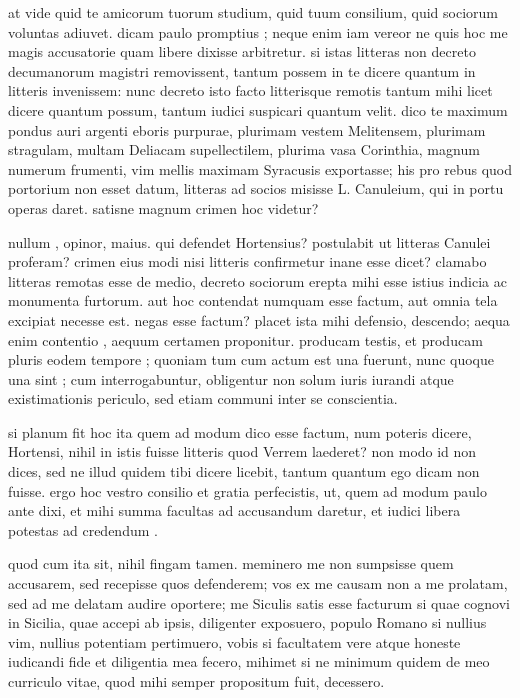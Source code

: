  at vide quid te amicorum tuorum studium, quid tuum consilium, quid sociorum voluntas adiuvet. dicam paulo promptius ; neque enim iam vereor ne quis hoc me magis accusatorie quam libere dixisse arbitretur. si istas litteras non decreto decumanorum magistri removissent, tantum possem in te dicere quantum in litteris invenissem: nunc decreto isto facto litterisque remotis tantum mihi licet dicere quantum possum, tantum iudici suspicari quantum velit. dico te maximum pondus auri argenti eboris purpurae, plurimam vestem Melitensem, plurimam stragulam, multam Deliacam supellectilem, plurima vasa Corinthia, magnum numerum frumenti, vim mellis maximam Syracusis exportasse; his pro rebus quod portorium non esset datum, litteras ad socios misisse L. Canuleium, qui in portu operas daret. satisne magnum crimen hoc videtur?

 nullum , opinor, maius. qui defendet Hortensius? postulabit ut litteras Canulei proferam? crimen eius modi nisi litteris confirmetur inane esse dicet? clamabo litteras remotas esse de medio, decreto sociorum erepta mihi esse istius indicia ac monumenta furtorum. aut hoc contendat numquam esse factum, aut omnia tela excipiat necesse est. negas esse factum? placet ista mihi defensio, descendo; aequa enim contentio , aequum certamen proponitur. producam testis, et producam pluris eodem tempore ; quoniam tum cum actum est una fuerunt, nunc quoque una sint ; cum interrogabuntur, obligentur non solum iuris iurandi atque existimationis periculo, sed etiam communi inter se conscientia.

 si planum fit hoc ita quem ad modum dico esse factum, num poteris dicere, Hortensi, nihil in istis fuisse litteris quod Verrem laederet? non modo id non dices, sed ne illud quidem tibi dicere licebit, tantum quantum ego dicam non fuisse. ergo hoc vestro consilio et gratia perfecistis, ut, quem ad modum paulo ante dixi, et mihi summa facultas ad accusandum daretur, et iudici libera potestas ad credendum .

 quod cum ita sit, nihil fingam tamen. meminero me non sumpsisse quem accusarem, sed recepisse quos defenderem; vos ex me causam non a me prolatam, sed ad me delatam audire oportere; me Siculis satis esse facturum si quae cognovi in Sicilia, quae accepi ab ipsis, diligenter exposuero, populo Romano si nullius vim, nullius potentiam pertimuero, vobis si facultatem vere atque honeste iudicandi fide et diligentia mea fecero, mihimet si ne minimum quidem de meo curriculo vitae, quod mihi semper propositum fuit, decessero.

